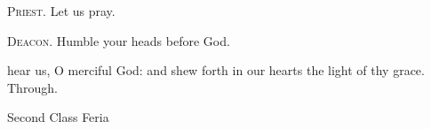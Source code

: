 \textsc{Priest.} Let us pray.\par
\textsc{Deacon.} Humble your heads before God.\par
{} hear us, O merciful God: and shew forth in our hearts the light of thy grace. Through.

\begin{inhead}
{Second Class Feria}
\end{inhead}
\par\noindent
{}

\properantiphonfix

